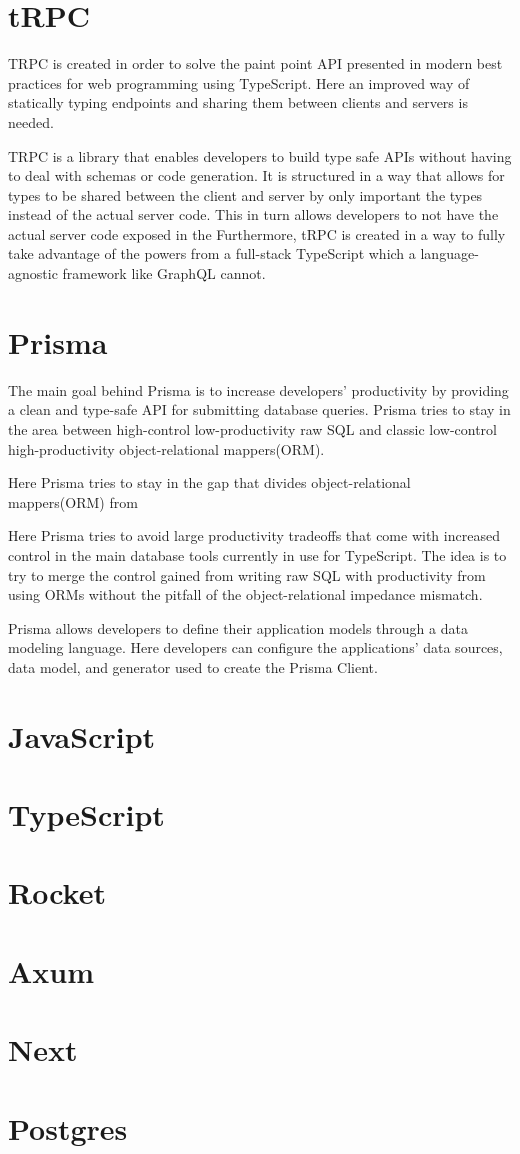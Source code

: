\section{tRPC}
TRPC is created in order to solve the paint point API presented in modern best practices for web programming using TypeScript. 
Here an improved way of statically typing endpoints and sharing them between clients and servers is needed\cite{tRPC}.

TRPC is a library that enables developers to build type safe APIs without having to deal with schemas or code generation. 
It is structured in a way that allows for types to be shared between the client and server by only important the types instead of the actual server code. 
This in turn allows developers to not have the actual server code exposed in the \frontend{} 
Furthermore, tRPC is created in a way to fully take advantage of the powers from a full-stack TypeScript which a language-agnostic framework like GraphQL cannot\cite{tRPC}.

\section{Prisma}
The main goal behind Prisma is to increase developers' productivity by providing a clean and type-safe API for submitting database queries\cite{Prisma_Why}.
Prisma tries to stay in the area between high-control low-productivity raw SQL and classic low-control high-productivity object-relational mappers(ORM). 

Here Prisma tries to stay in the gap that divides object-relational mappers(ORM) from 

Here Prisma tries to avoid large productivity tradeoffs that come with increased control in the main database tools currently in use for TypeScript. The idea is to try to merge the control gained from writing raw SQL with productivity from using ORMs without the pitfall of the object-relational impedance mismatch\cite{Prisma_Why}.

Prisma allows developers to define their application models through a data modeling language. Here developers can configure the applications' data sources, data model, and generator used to create the Prisma Client\cite{Prisma_Doc}.

\section{JavaScript}
\section{TypeScript}
\section{Rocket}
\section{Axum}
\section{Next}
\section{Postgres}


